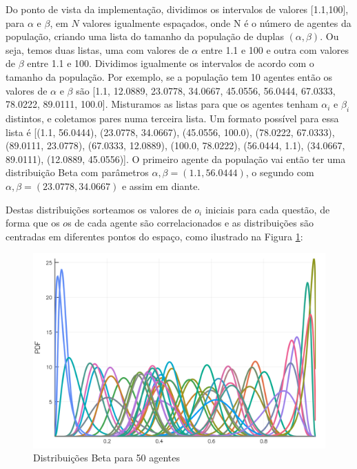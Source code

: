 Do ponto de vista da implementação, dividimos os intervalos de valores
[1.1,100], para \(\alpha\) e \(\beta\), em \(N\) valores igualmente espaçados, onde N é o
número de agentes da população, criando uma lista do tamanho da população de
duplas \((\alpha,\beta)\). Ou seja, temos duas listas, uma com valores de \(\alpha\) entre 1.1
e 100 e outra com valores de \(\beta\) entre 1.1 e 100. Dividimos igualmente os
intervalos de acordo com o tamanho da população. Por exemplo, se a população tem
10 agentes então os valores de \(\alpha\) e \(\beta\) são [1.1, 12.0889, 23.0778,
34.0667, 45.0556, 56.0444, 67.0333, 78.0222, 89.0111, 100.0]. Misturamos as
listas para que os agentes tenham \(\alpha_i\) e \(\beta_i\) distintos, e coletamos pares
numa terceira lista. Um formato possível para essa lista é [(1.1, 56.0444),
(23.0778, 34.0667), (45.0556, 100.0), (78.0222, 67.0333), (89.0111, 23.0778),
(67.0333, 12.0889), (100.0, 78.0222), (56.0444, 1.1), (34.0667, 89.0111),
(12.0889, 45.0556)]. O primeiro agente da população vai então ter uma
distribuição Beta com parâmetros \(\alpha,\beta = (1.1, 56.0444) \), o segundo com
\(\alpha,\beta=(23.0778,34.0667)\) e assim em diante.

Destas distribuições sorteamos os valores de \(o_i\) iniciais para cada questão,
de forma que os \(o\)s de cada agente são correlacionados e as distribuições são
centradas em diferentes pontos do espaço, como ilustrado na Figura
\ref{fig:betas100}:

\begin{figure}[H]
  \centering
  \includegraphics[width=\textwidth]{ims/beta100.png}
  \caption{Distribuições Beta para 50 agentes}
  \label{fig:betas100}
\end{figure}


